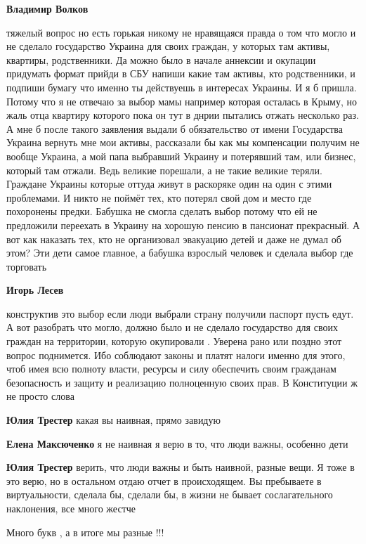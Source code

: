 \begin{itemize}
\begin{itemize}
\textbf{Владимир Волков} 

тяжелый вопрос но есть горькая никому не нравящаяся правда о том что могло и не
сделало государство Украина для своих граждан, у которых там активы, квартиры,
родственники. Да можно было в начале аннексии и окупации придумать формат
прийди в СБУ напиши какие там активы, кто родственники, и подпиши бумагу что
именно ты действуешь в интересах Украины. И я б пришла. Потому что я не отвечаю
за выбор мамы например которая осталась в Крыму, но жаль отца квартиру которого
пока он тут в днрии пытались отжать несколько раз. А мне б после такого
заявления выдали б обязательство от имени Государства Украина вернуть мне мои
активы, рассказали бы как мы компенсации получим не вообще Украина, а мой папа
выбравший Украину и потерявший там, или бизнес, который там отжали. Ведь
великие порешали, а не такие великие теряли. Граждане Украины которые оттуда
живут в раскоряке один на один с этими проблемами. И никто не поймёт тех, кто
потерял свой дом и место где похоронены предки. Бабушка не смогла сделать выбор
потому что ей не предложили переехать в Украину на хорошую пенсию в пансионат
прекрасный. А вот как наказать тех, кто не организовал эвакуацию детей и даже
не думал об этом? Эти дети самое главное, а бабушка взрослый человек и сделала
выбор где торговать

\textbf{Игорь Лесев} 

конструктив это выбор если люди выбрали страну получили паспорт пусть едут. А
вот разобрать что могло, должно было и не сделало государство для своих граждан
на территории, которую окупировали . Уверена рано или поздно этот вопрос
поднимется. Ибо соблюдают законы и платят налоги именно для этого, чтоб имея
всю полноту власти, ресурсы и силу обеспечить своим гражданам безопасность и
защиту и реализацию полноценную своих прав. В Конституции ж не просто слова


\textbf{Юлия Трестер} какая вы наивная, прямо завидую

\textbf{Елена Максюченко} я не наивная я верю в то, что люди важны, особенно дети

\textbf{Юлия Трестер} верить, что люди важны и быть наивной, разные вещи. Я тоже в это верю, но в остальном отдаю отчет в происходящем. Вы пребываете в виртуальности, сделала бы, сделали бы, в жизни не бывает сослагательного наклонения, все много жестче

Много букв , а в итоге мы разные !!!


\end{itemize}
\end{itemize}
